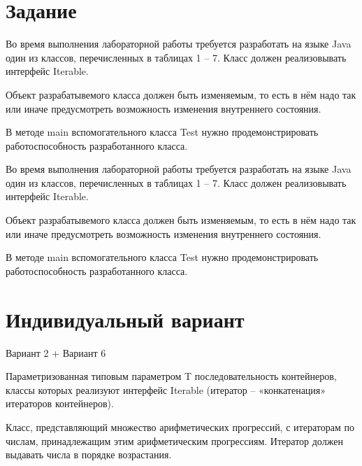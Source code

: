 \documentclass[a4paper, 14pt]{extarticle}
\begin{document}
\section{Задание}\label{Sect::task}
\par
Во время выполнения лабораторной работы требуется разработать на языке Java один из классов, перечисленных в таблицах 1 – 7. Класс должен реализовывать интерфейс Iterable. 
\par
Объект разрабатывемого класса должен быть изменяемым, то есть в нём надо так или иначе предусмотреть возможность изменения внутреннего состояния. 
\par
В методе main вспомогательного класса Test нужно продемонстрировать работоспособность разработанного класса. 
\par
Во время выполнения лабораторной работы требуется разработать на языке Java один из классов, перечисленных в таблицах 1 – 7. Класс должен реализовывать интерфейс Iterable. 
\par
Объект разрабатывемого класса должен быть изменяемым, то есть в нём надо так или иначе предусмотреть возможность изменения внутреннего состояния. 
\par
В методе main вспомогательного класса Test нужно продемонстрировать работоспособность разработанного класса. 

\section{Индивидуальный вариант}
\par
Вариант 2 + Вариант 6
\par 
Параметризованная типовым параметром T последовательность контейнеров, классы которых реализуют интерфейс Iterable (итератор – «конкатенация» итераторов контейнеров). 
\par
Класс, представляющий множество арифметических прогрессий, с итераторам по числам, принадлежащим этим арифметическим прогрессиям. Итератор должен выдавать числа в порядке возрастания. 
\end{document}
